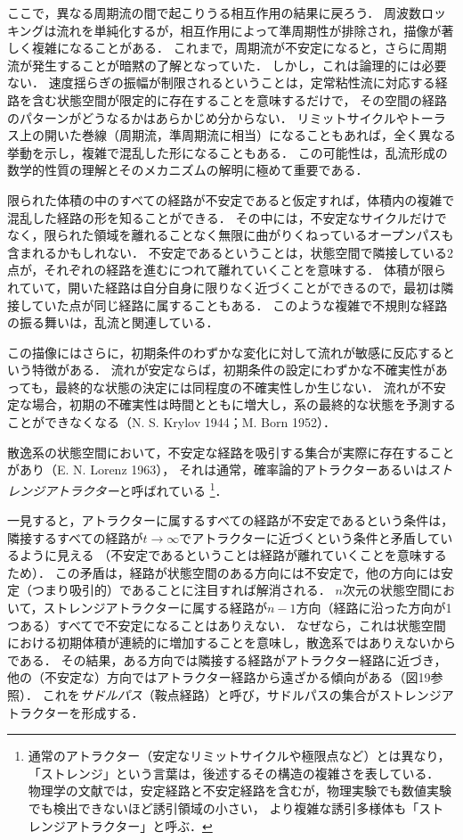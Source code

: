 ここで，異なる周期流の間で起こりうる相互作用の結果に戻ろう．
周波数ロッキングは流れを単純化するが，相互作用によって準周期性が排除され，描像が著しく複雑になることがある．
これまで，周期流が不安定になると，さらに周期流が発生することが暗黙の了解となっていた．
しかし，これは論理的には必要ない．
速度揺らぎの振幅が制限されるということは，定常粘性流に対応する経路を含む状態空間が限定的に存在することを意味するだけで，
その空間の経路のパターンがどうなるかはあらかじめ分からない．
リミットサイクルやトーラス上の開いた巻線（周期流，準周期流に相当）になることもあれば，全く異なる挙動を示し，複雑で混乱した形になることもある．
この可能性は，乱流形成の数学的性質の理解とそのメカニズムの解明に極めて重要である．




限られた体積の中のすべての経路が不安定であると仮定すれば，体積内の複雑で混乱した経路の形を知ることができる．
その中には，不安定なサイクルだけでなく，限られた領域を離れることなく無限に曲がりくねっているオープンパスも含まれるかもしれない．
不安定であるということは，状態空間で隣接している2点が，それぞれの経路を進むにつれて離れていくことを意味する．
体積が限られていて，開いた経路は自分自身に限りなく近づくことができるので，最初は隣接していた点が同じ経路に属することもある．
このような複雑で不規則な経路の振る舞いは，乱流と関連している．


この描像にはさらに，初期条件のわずかな変化に対して流れが敏感に反応するという特徴がある．
流れが安定ならば，初期条件の設定にわずかな不確実性があっても，最終的な状態の決定には同程度の不確実性しか生じない．
流れが不安定な場合，初期の不確実性は時間とともに増大し，系の最終的な状態を予測することができなくなる（N. S. Krylov 1944；M. Born 1952）．




散逸系の状態空間において，不安定な経路を吸引する集合が実際に存在することがあり（E. N. Lorenz 1963），
それは通常，確率論的アトラクターあるいは\emph{ストレンジアトラクター}と呼ばれている
\footnote{通常のアトラクター（安定なリミットサイクルや極限点など）とは異なり，
「ストレンジ」という言葉は，後述するその構造の複雑さを表している．
物理学の文献では，安定経路と不安定経路を含むが，物理実験でも数値実験でも検出できないほど誘引領域の小さい，
より複雑な誘引多様体も「ストレンジアトラクター」と呼ぶ．}．




一見すると，アトラクターに属するすべての経路が不安定であるという条件は，
隣接するすべての経路が$t\to\infty$でアトラクターに近づくという条件と矛盾しているように見える
（不安定であるということは経路が離れていくことを意味するため）．
この矛盾は，経路が状態空間のある方向には不安定で，他の方向には安定（つまり吸引的）であることに注目すれば解消される．
$n$次元の状態空間において，ストレンジアトラクターに属する経路が$n-1$方向（経路に沿った方向が1つある）すべてで不安定になることはありえない．
なぜなら，これは状態空間における初期体積が連続的に増加することを意味し，散逸系ではありえないからである．
その結果，ある方向では隣接する経路がアトラクター経路に近づき，他の（不安定な）方向ではアトラクター経路から遠ざかる傾向がある（図19参照）．
これを\emph{サドルパス}（鞍点経路）と呼び，サドルパスの集合がストレンジアトラクターを形成する．



